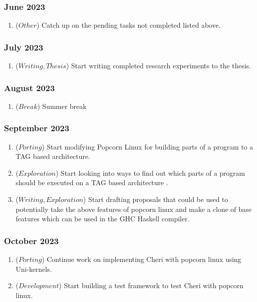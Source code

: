   \subsubsection{June 2023}
  \begin{enumerate}
     \item (\(Other\)) Catch up on the pending tasks not completed listed above. 
  \end{enumerate}

  \subsubsection{July 2023}
  \begin{enumerate}
     \item (\(Writing, Thesis\)) Start writing completed research experiments to the thesis. 
  \end{enumerate}

  \subsubsection{August 2023}
  \begin{enumerate}
    \item (\(Break\)) Summer break 
 \end{enumerate}

 \subsubsection{September 2023}
  \begin{enumerate}
    \item (\(Porting\)) Start modifying Popcorn Linux for building parts of a program to a TAG based architecture.
    \item (\(Exploration\)) Start looking into ways to find out which parts of a program should be executed on a TAG based architecture \cite{PopcornEnclave}.
    \item (\(Writing, Exploration\)) Start drafting proposals that could be used to potentially take the above features of popcorn linux and make a clone of 
    base features which can be used in the GHC Haskell compiler.
 \end{enumerate}

 \subsubsection{October 2023}
  \begin{enumerate}
    \item (\(Porting\)) Continue work on implementing Cheri with popcorn linux using Uni-kernels. 
    \item (\(Development\)) Start building a test framework to test Cheri with popcorn linux.
 \end{enumerate}


